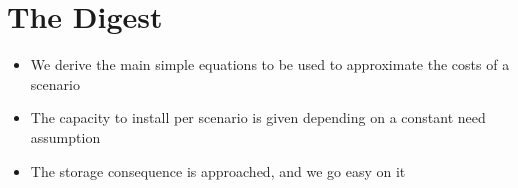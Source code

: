 \blindtext

\section{The Digest}


\begin{kaoboxgreen}[frametitle=Main Takeaways]

\begin{itemize}
\item We derive the main simple equations to be used to approximate the costs of a scenario
\item The capacity to install per scenario is given depending on a constant need assumption
\item The storage consequence is approached, and we go easy on it
\end{itemize}
  
\end{kaoboxgreen}
